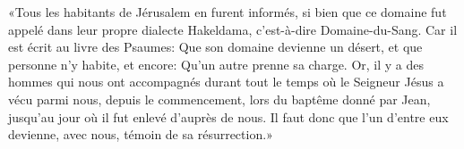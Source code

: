 «Tous les habitants de Jérusalem en furent informés,
	si bien que ce domaine fut appelé dans leur propre dialecte Hakeldama,
	c’est-à-dire Domaine-du-Sang.
Car il est écrit au livre des Psaumes:
	Que son domaine devienne un désert, et que personne n’y habite,
	et encore: Qu’un autre prenne sa charge.
Or, il y a des hommes qui nous ont accompagnés
	durant tout le temps où le Seigneur Jésus a vécu parmi nous,
	depuis le commencement, lors du baptême donné par Jean,
	jusqu’au jour où il fut enlevé d’auprès de nous.
Il faut donc que l’un d’entre eux devienne, avec nous,
	témoin de sa résurrection.»
